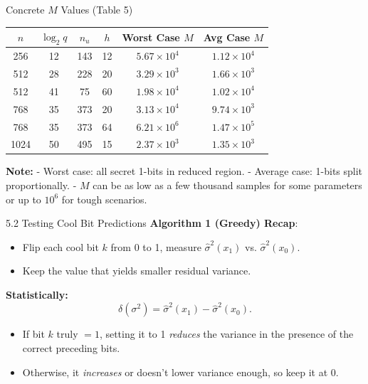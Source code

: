 \documentclass{beamer}
\begin{document}
\begin{frame}{Concrete $M$ Values (Table 5)}
  \begin{center}
    \scriptsize
    \begin{tabular}{cccccc}
    \toprule
    $n$ & $\log_2 q$ & $n_u$ & $h$ & Worst Case $M$ & Avg Case $M$ \\
    \midrule
    256 & 12 & 143 & 12 & $5.67\times10^4$ & $1.12\times10^4$ \\
    512 & 28 & 228 & 20 & $3.29\times10^3$ & $1.66\times10^3$ \\
    512 & 41 & 75  & 60 & $1.98\times10^4$ & $1.02\times10^4$ \\
    768 & 35 & 373 & 20 & $3.13\times10^4$ & $9.74\times10^3$ \\
    768 & 35 & 373 & 64 & $6.21\times10^6$ & $1.47\times10^5$ \\
    1024 & 50 & 495 & 15 & $2.37\times10^3$ & $1.35\times10^3$ \\
    \bottomrule
    \end{tabular}
  \end{center}

  \vspace{0.2cm}
  \scriptsize{
    \textbf{Note:}
    - Worst case: all secret 1-bits in reduced region.  
    - Average case: 1-bits split proportionally.  
    - $M$ can be as low as a few thousand samples for some parameters or up to $10^6$ for tough scenarios.
  }
\end{frame}

\begin{frame}{5.2 Testing Cool Bit Predictions}
  \textbf{Algorithm 1 (Greedy) Recap}:  
  \begin{itemize}
    \item Flip each cool bit $k$ from 0 to 1,
      measure $\hat{\sigma}^2(x_1)$ vs. $\hat{\sigma}^2(x_0)$.
    \item Keep the value that yields smaller residual variance.
  \end{itemize}

  \textbf{Statistically:}
  \[
    \delta(\sigma^2) = \hat{\sigma}^2(x_1) - \hat{\sigma}^2(x_0).
  \]
  \begin{itemize}
    \item If bit $k$ truly $=1$, setting it to 1 \emph{reduces} the variance in the presence of the correct preceding bits.
    \item Otherwise, it \emph{increases} or doesn't lower variance enough, so keep it at 0.
  \end{itemize}
\end{frame}
\end{document}
